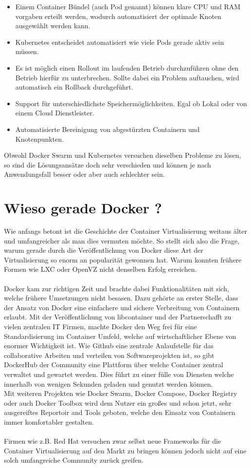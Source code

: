 \documentclass[12pt,toc=bib,toc=listof]{scrreprt}
\begin{document}
\begin{itemize}
	\item Einem Container Bündel (auch Pod genannt) können klare CPU und RAM vorgaben erteilt werden, wodurch automatisiert der optimale Knoten ausgewählt werden kann.
	\item Kubernetes entscheidet automatisiert wie viele Pods gerade aktiv sein müssen.
	\item Es ist möglich einen Rollout im laufenden Betrieb durchzuführen ohne den Betrieb hierfür zu unterbrechen. Sollte dabei ein Problem auftauchen, wird automatisch ein Rollback durchgeführt.
	\item Support für unterschiedlichste Speichermöglichkeiten. Egal ob Lokal oder von einem Cloud Dienstleister.
	\item Automatisierte Bereinigung von abgestürzten Containern und Knotenpunkten.
\end{itemize}
Obwohl Docker Swarm und Kubernetes versuchen dieselben Probleme zu lösen, so sind die Lösungsansätze doch sehr verschieden und können je nach Anwendungsfall besser oder aber auch schlechter sein.

\section{Wieso gerade Docker ?}
Wie anfangs betont ist die Geschichte der Container Virtualisierung weitaus älter und umfangreicher als man dies vermuten möchte.
So stellt sich also die Frage, warum gerade durch die Veröffentlichung von Docker diese Art der Virtualisierung so enorm an popularität gewonnen hat.
Warum konnten frühere Formen wie LXC oder OpenVZ nicht denselben Erfolg erreichen.\\
\\
Docker kam zur richtigen Zeit und brachte dabei Funktionalitäten mit sich, welche frühere Umsetzungen nicht besasen.
Dazu gehörte an erster Stelle, dass der Ansatz von Docker eine einfachere und sichere Verbreitung von Containern erlaubt.
Mit der Veröffentlichung von libcontainer und der Partnerschafft zu vielen zentralen IT Firmen, machte Docker den Weg frei für eine Standardisierung im Container Umfeld, welche auf wirtschaftlicher Ebene von enormer Wichtigkeit ist.
Wie Github eine zentrale Anlaufstelle für das collaborative Arbeiten und verteilen von Softwareprojekten ist, so gibt DockerHub der Community eine Plattform über welche Container zentral verwaltet und gewartet werden.
Dies führt zu einer fülle von Diensten welche innerhalb von wenigen Sekunden geladen und genutzt werden können.\\
Mit weiteren Projekten wie Docker Swarm, Docker Compose, Docker Registry oder auch Docker Toolbox wird dem Nutzer ein großes und schon jetzt, sehr ausgereiftes Reportoir and Tools geboten, welche den Einsatz von Containern immer komfortabler gestalten.\\
\\
Firmen wie z.B. Red Hat versuchen zwar selbst neue Frameworks für die Container Virtualisierung auf den Markt zu bringen können jedoch nicht auf eine solch umfangreiche Community zurück greifen.
\end{document}
